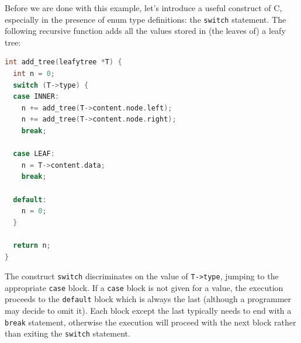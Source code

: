 Before we are done with this example, let's introduce a useful
construct of C, especially in the presence of enum type definitions:
the \lstinline'switch' statement.  The following recursive function
adds all the values stored in (the leaves of) a leafy tree:

\begin{lstlisting}[language=c]
int add_tree(leafytree *T) {
  int n = 0;
  switch (T->type) {
  case INNER:
    n += add_tree(T->content.node.left);
    n += add_tree(T->content.node.right);
    break;

  case LEAF:
    n = T->content.data;
    break;

  default:
    n = 0;
  }

  return n;
}
\end{lstlisting}
The construct \lstinline'switch' discriminates on the value of
\lstinline'T->type', jumping to the appropriate \lstinline'case'
block.  If a \lstinline'case' block is not given for a value, the
execution proceeds to the \lstinline'default' block which is always
the last (although a programmer may decide to omit it).  Each block
except the last typically needs to end with a \lstinline'break'
statement, otherwise the execution will proceed with the next block
rather than exiting the \lstinline'switch' statement.

